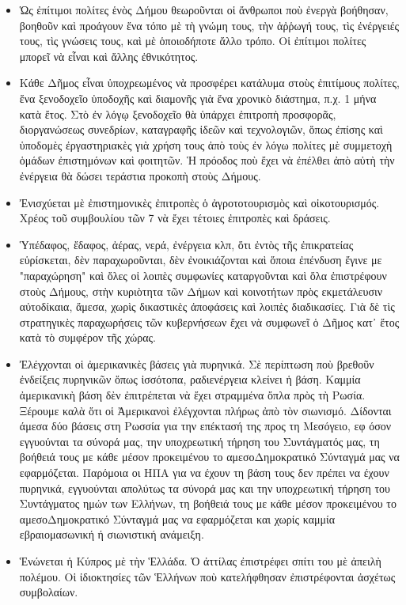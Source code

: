 \documentclass[a4paper]{article}
\begin{document}
\begin{itemize}
\item Ὡς ἐπίτιμοι πολίτες ἑνὸς Δήμου θεωροῦνται οἱ ἄνθρωποι ποὺ ἐνεργὰ βοήθησαν, βοηθοῦν καὶ προάγουν ἕνα τόπο μὲ τὴ γνώμη τους, τὴν ἀῤῥωγή τους, τὶς ἐνέργειές τους, τὶς γνώσεις τους, καὶ μὲ ὁποιοδήποτε ἄλλο τρόπο. Οἱ ἐπίτιμοι πολίτες μπορεῖ νὰ εἶναι καὶ ἄλλης ἐθνικότητος.
\item Κάθε Δῆμος εἶναι ὑποχρεωμένος νὰ προσφέρει κατάλυμα στοὺς ἐπιτίμους πολίτες, ἕνα ξενοδοχεῖο ὑποδοχῆς καὶ διαμονῆς γιὰ ἕνα χρονικὸ διάστημα, π.χ. 1 μήνα κατὰ ἔτος. Στὸ ἐν λόγῳ ξενοδοχεῖο θὰ ὑπάρχει ἐπιτροπὴ προσφορᾶς, διοργανώσεως συνεδρίων, καταγραφῆς ἰδεῶν καὶ τεχνολογιῶν, ὅπως ἐπίσης καὶ ὑποδομὲς ἐργαστηριακὲς γιὰ χρήση τους ἀπὸ τοὺς ἐν λόγω πολίτες μὲ συμμετοχὴ ὁμάδων ἐπιστημόνων καὶ φοιτητῶν. Ἡ πρόοδος ποὺ ἔχει νὰ ἐπέλθει ἀπὸ αὐτὴ τὴν ἐνέργεια θὰ δώσει τεράστια προκοπὴ στοὺς Δήμους.
\item Ἐνισχύεται μὲ ἐπιστημονικὲς ἐπιτροπὲς ὁ ἀγροτοτουρισμὸς καὶ οἰκοτουρισμός. Χρέος τοῦ συμβουλίου τῶν 7 νὰ ἔχει τέτοιες ἐπιτροπὲς καὶ δράσεις.
\item Ὑπέδαφος, ἔδαφος, ἀέρας, νερά, ἐνέργεια κλπ, ὅτι ἐντὸς τῆς ἐπικρατείας εὑρίσκεται, δὲν παραχωροῦνται, δὲν ἐνοικιάζονται καὶ ὅποια ἐπένδυση ἔγινε με "παραχώρηση" καὶ ὄλες οἱ λοιπὲς συμφωνίες καταργοῦνται καὶ ὅλα ἐπιστρέφουν στοὺς Δήμους, στὴν κυριὸτητα τῶν Δήμων καὶ κοινοτήτων πρὸς εκμετάλευσιν αὐτοδίκαια, ἄμεσα, χωρὶς δικαστικὲς ἀποφάσεις καὶ λοιπὲς διαδικασίες. Γιὰ δὲ τὶς στρατηγικὲς παραχωρήσεις τῶν κυβερνήσεων ἔχει νὰ συμφωνεῖ ὁ Δῆμος κατ᾿ ἔτος κατὰ τὸ συμφέρον τῆς χώρας.
\item Ἐλέγχονται οἱ ἀμερικανικὲς βάσεις γιὰ πυρηνικά. Σὲ περίπτωση ποὺ βρεθοῦν ἐνδείξεις πυρηνικῶν ὅπως ἰσσότοπα, ραδιενέργεια κλείνει ἡ βάση. Καμμία ἀμερικανικὴ βάση δὲν ἐπιτρέπεται νὰ ἔχει στραμμένα ὄπλα πρὸς τὴ Ρωσία. Ξέρουμε καλὰ ὅτι οἱ Ἀμερικανοὶ ἐλέγχονται πλήρως ἀπὸ τὸν σιωνισμό. Δίδονται άμεσα δύο βάσεις στη Ρωσσία για την επέκτασή της προς τη Μεσόγειο, εφ όσον εγγυούνται τα σύνορά μας, την υποχρεωτική τήρηση του Συντάγματός μας, τη βοήθειά τους με κάθε μέσον προκειμένου το αμεσοΔημοκρατικό Σύνταγμά μας να εφαρμόζεται. Παρόμοια οι ΗΠΑ για να έχουν τη βάση τους δεν πρέπει να έχουν πυρηνικά, εγγυούνται απολύτως τα σύνορά μας και την υποχρεωτική τήρηση του Συντάγματος ημών των Ελλήνων, τη βοήθειά τους με κάθε μέσον προκειμένου το αμεσοΔημοκρατικό Σύνταγμά μας να εφαρμόζεται και χωρίς καμμία εβραιομασωνική ή σιωνιστική ανάμειξη.
\item Ἑνώνεται ἡ Κύπρος μὲ τὴν Ἑλλάδα. Ὁ ἀττίλας ἐπιστρέφει σπίτι του μὲ ἀπειλὴ πολέμου. Οἱ ἰδιοκτησίες τῶν Ἑλλήνων ποὺ κατελήφθησαν ἐπιστρέφονται ἀσχέτως συμβολαίων.

\end{itemize}
\end{document}

